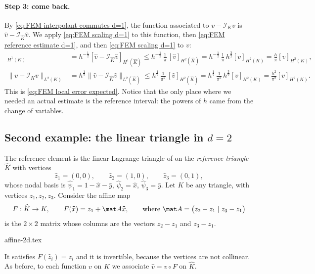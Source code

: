 \paragraph{Step 3: come back.}
By \eqref{eq:FEM interpolant commutes d=1}, the function associated to $v - \mathcal I_K v$ is $\widehat v - \mathcal I_{\widehat K} \widehat v$. We apply \eqref{eq:FEM scaling d=1} to this function, then \eqref{eq:FEM reference estimate d=1}, and then \eqref{eq:FEM scaling d=1} to $v$:
\begin{align*}
    [ v - \mathcal I_K v ]_{H^1(K)}
     & = h^{-\frac 1 2} [ \widehat v - \mathcal I_{\widehat K} \widehat v ]_{H^1(\widehat K)}
    \le h^{-\frac 1 2}\, \frac 1 \pi\, [ \widehat v ]_{H^2(\widehat K)}
    = h^{-\frac 1 2}\, \frac 1 \pi\, h^{\frac 3 2} [ v ]_{H^2(K)}
    = \frac{h}{\pi} [ v ]_{H^2(K)},
    \\
    \| v - \mathcal I_K v \|_{L^2(K)}
     & = h^{\frac 1 2} \| \widehat v - \mathcal I_{\widehat K} \widehat v \|_{L^2(\widehat K)}
    \le h^{\frac 1 2}\, \frac 1 {\pi^2}\, [ \widehat v ]_{H^2(\widehat K)}
    = h^{\frac 1 2}\, \frac 1 {\pi^2}\, h^{\frac 3 2} [ v ]_{H^2(K)}
    = \frac{h^2}{\pi^2} [ v ]_{H^2(K)}.
\end{align*}
This is \eqref{eq:FEM local error expected}.
Notice that the only place where we needed an actual estimate is the reference interval: the powers of $h$ came from the change of variables.

\subsection{Second example: the linear triangle in \texorpdfstring{$d = 2$}{d=2}}
\label{sec:FEM affine equivalence d=2}

The reference element is the linear Lagrange triangle of  on the \emph{reference triangle} $\widehat K$ with vertices
\begin{equation*}
    \widehat z_1 = (0,0), \qquad \widehat z_2 = (1,0), \qquad \widehat z_3 = (0,1),
\end{equation*}
whose nodal basis is $\widehat \psi_1 = 1 - \widehat x - \widehat y$, $\widehat \psi_2 = \widehat x$, $\widehat \psi_3 = \widehat y$.
Let $K$ be any triangle, with vertices $z_1, z_2, z_3$. Consider the affine map
\begin{equation*}
    F : \widehat K \to K,
    \qquad
    F(\widehat x) = z_1 + \mat A \widehat x,
    \qquad \text{where }
    \mat A = \big( z_2 - z_1 \mid z_3 - z_1 \big)
\end{equation*}
is the $2 \times 2$ matrix whose columns are the vectors $z_2 - z_1$ and $z_3 - z_1$.
\begin{center}
    {affine-2d.tex}
\end{center}
It satisfies $F(\widehat z_i) = z_i$ and it is invertible, because the vertices are not collinear.
As before, to each function $v$ on $K$ we associate $\widehat v = v \circ F$ on $\widehat K$.

